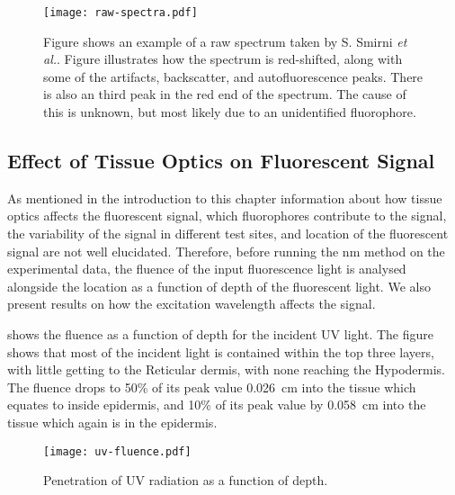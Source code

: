 \begin{figure}[!htpb]
  \centering
  \texttt{[image: raw-spectra.pdf]}
  \caption{Figure shows an example of a raw spectrum taken by S. Smirni \textit{et al.}. Figure illustrates how the spectrum is red-shifted, along with some of the artifacts, backscatter, and autofluorescence peaks. There is also an third peak in the red end of the spectrum. The cause of this is unknown, but most likely due to an unidentified fluorophore.}
  \label{fig:slavodataexample}
\end{figure}

\subsection*{Effect of Tissue Optics on Fluorescent Signal}

As mentioned in the introduction to this chapter information about how tissue optics affects the fluorescent signal, which fluorophores contribute to the signal, the variability of the signal in different test sites, and location of the fluorescent signal are not well elucidated. 
Therefore, before running the \gls*{nm} method on the experimental data, the fluence of the input fluorescence light is analysed alongside the location as a function of depth of the fluorescent light.
We also present results on how the excitation wavelength affects the signal.

 shows the fluence as a function of depth for the incident UV light.
The figure shows that most of the incident light is contained within the top three layers, with little getting to the Reticular dermis, with none reaching the Hypodermis.
The fluence drops to 50\% of its peak value 0.026~cm into the tissue which equates to inside epidermis, and 10\% of its peak value by 0.058~cm into the tissue which again is in the epidermis.

\begin{figure}[!htpb]
    \centering
    \texttt{[image: uv-fluence.pdf]}
    \caption{Penetration of UV radiation as a function of depth.}
    \label{fig:uvpen}
\end{figure}

